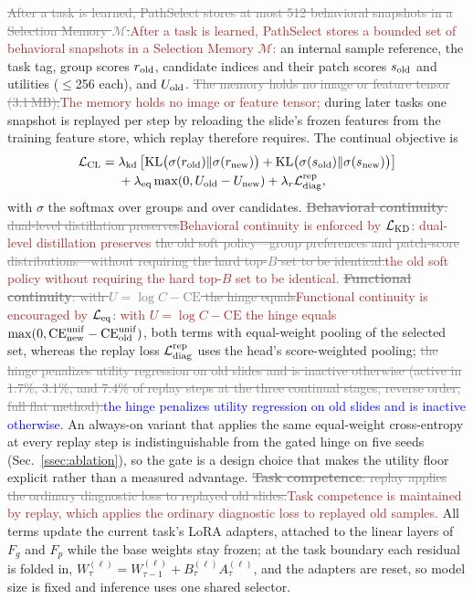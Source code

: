 \documentclass{article}
\newif\ifmarkup \markuptrue
\newcommand{\repc}[3]{\ifmarkup\textcolor{gray}{\sout{#2}}\textcolor{#1}{#3}\else#3\fi}
\newcommand{\repB}[2]{\repc{brown}{#1}{#2}}   %
\newcommand{\repL}[2]{\repc{blue}{#1}{#2}}    %
\def\L{{\cal L}}
\newcommand{\Fg}{F_g}
\newcommand{\Fp}{F_p}
\newcommand{\Mem}{\mathcal{M}}
\begin{document}
\repB{After a task is learned, PathSelect stores at most 512 behavioral snapshots in a Selection Memory $\Mem$:}{After a task is learned, PathSelect stores a bounded set of behavioral snapshots in a Selection Memory $\Mem$:} an internal sample reference, the task tag, group scores $r_{\rm old}$, candidate indices and their patch scores $s_{\rm old}$ and utilities ($\le$256 each), and $U_{\rm old}$. \repB{The memory holds no image or feature tensor (3.1\,MB);}{The memory holds no image or feature tensor;} during later tasks one snapshot is replayed per step by reloading the slide's frozen features from the training feature store, which replay therefore requires. The continual objective is
\begin{align}
\L_{\mathrm{CL}}
={}&
\lambda_{\mathrm{kd}}
\left[
\mathrm{KL}\bigl(\sigma(r_{\mathrm{old}})\Vert \sigma(r_{\mathrm{new}})\bigr)
+
\mathrm{KL}\bigl(\sigma(s_{\mathrm{old}})\Vert \sigma(s_{\mathrm{new}})\bigr)
\right]
\nonumber\\
&+
\lambda_{\mathrm{eq}}
\max(0,U_{\mathrm{old}}-U_{\mathrm{new}})
+
\lambda_r \L_{\mathrm{diag}}^{\mathrm{rep}},
\label{eq:lcl}
\end{align}
with $\sigma$ the softmax over groups and over candidates. \repB{\textbf{Behavioral continuity}: dual-level distillation preserves}{Behavioral continuity is enforced by $\L_{\rm KD}$: dual-level distillation preserves} \repB{the old soft policy---group preferences and patch-score distributions---without requiring the hard top-$B$ set to be identical.}{the old soft policy without requiring the hard top-$B$ set to be identical.} \repB{\textbf{Functional continuity}: with $U=\log C-\mathrm{CE}$ the hinge equals}{Functional continuity is encouraged by $\L_{\rm eq}$: with $U=\log C-\mathrm{CE}$ the hinge equals} $\max(0,\mathrm{CE}^{\rm unif}_{\rm new}-\mathrm{CE}^{\rm unif}_{\rm old})$, both terms with equal-weight pooling of the selected set, whereas the replay loss $\L_{\mathrm{diag}}^{\mathrm{rep}}$ uses the head's score-weighted pooling; \repL{the hinge penalizes utility regression on old slides and is inactive otherwise (active in 1.7\%, 3.1\%, and 7.4\% of replay steps at the three continual stages, reverse order, full flat method).}{the hinge penalizes utility regression on old slides and is inactive otherwise.} An always-on variant that applies the same equal-weight cross-entropy at every replay step is indistinguishable from the gated hinge on five seeds (Sec.~\ref{ssec:ablation}), so the gate is a design choice that makes the utility floor explicit rather than a measured advantage. \repB{\textbf{Task competence}: replay applies the ordinary diagnostic loss to replayed old slides.}{Task competence is maintained by replay, which applies the ordinary diagnostic loss to replayed old samples.} All terms update the current task's LoRA adapters, attached to the linear layers of $\Fg$ and $\Fp$ while the base weights stay frozen; at the task boundary each residual is folded in, $W^{(\ell)}_{\tau}=W^{(\ell)}_{\tau-1}+B^{(\ell)}_\tau A^{(\ell)}_\tau$, and the adapters are reset, so model size is fixed and inference uses one shared selector.
\end{document}

